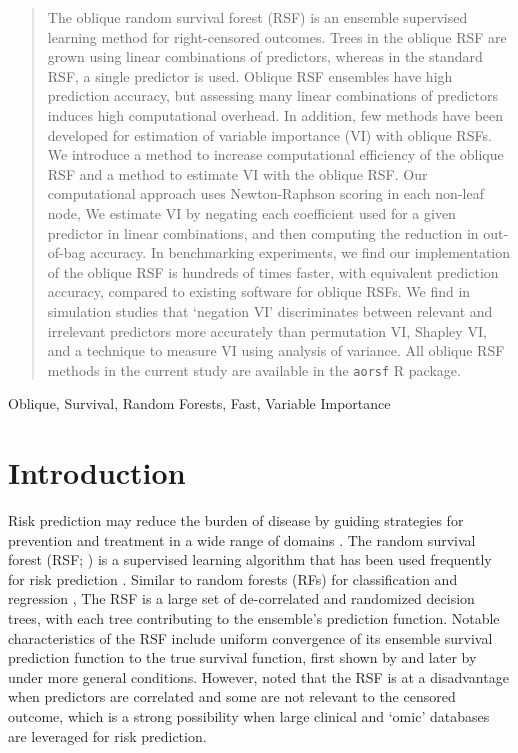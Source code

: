 \documentclass[twoside,11pt]{article}\usepackage[]{graphicx}\usepackage[]{xcolor}
\begin{document}
\newpage

\begin{abstract}

	The oblique random survival forest (RSF) is an ensemble supervised learning method for right-censored outcomes. Trees in the oblique RSF are grown using linear combinations of predictors, whereas in the standard RSF, a single predictor is used. Oblique RSF ensembles have high prediction accuracy, but assessing many linear combinations of predictors induces high computational overhead. In addition, few methods have been developed for estimation of variable importance (VI) with oblique RSFs. We introduce a method to increase computational efficiency of the oblique RSF and a method to estimate VI with the oblique RSF. Our computational approach uses Newton-Raphson scoring in each non-leaf node, We estimate VI by negating each coefficient used for a given predictor in linear combinations, and then computing the reduction in out-of-bag accuracy. In benchmarking experiments, we find our implementation of the oblique RSF is hundreds of times faster, with equivalent prediction accuracy, compared to existing software for oblique RSFs. We find in simulation studies that `negation VI' discriminates between relevant and irrelevant predictors more accurately than permutation VI, Shapley VI, and a technique to measure VI using analysis of variance. All  oblique RSF methods in the current study are available in the \texttt{aorsf} R package.

\end{abstract}

\begin{keywords}
Oblique, Survival, Random Forests, Fast, Variable Importance
\end{keywords}

\section{Introduction}

Risk prediction may reduce the burden of disease by guiding strategies for prevention and treatment in a wide range of domains \citep{moons2012riskII, moons2012riskI}. The random survival forest (RSF; \citet{ishwaran2008random, hothorn2006unbiased}) is a supervised learning algorithm that has been used frequently for risk prediction \citep{wang2017selective}. Similar to random forests (RFs) for classification and regression \citep{breiman2001random}, The RSF is a large set of de-correlated and randomized decision trees, with each tree contributing to the ensemble's prediction function. Notable characteristics of the RSF include uniform convergence of its ensemble survival prediction function to the true survival function, first shown by \citet{ishwaran2010consistency} and later by \citet{cui2017consistency} under more general conditions. However, \citet{cui2017consistency} noted that the RSF is at a disadvantage when predictors are correlated and some are not relevant to the censored outcome, which is a strong possibility when large clinical and `omic' databases are leveraged for risk prediction.
\end{document}

